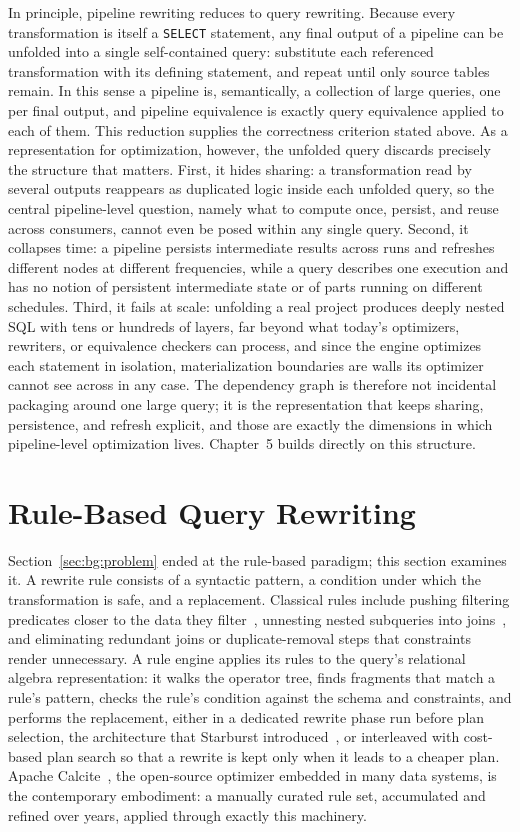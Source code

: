 In principle, pipeline rewriting reduces to query rewriting. Because
every transformation is itself a \texttt{SELECT} statement, any
final output of a pipeline can be unfolded into a single
self-contained query: substitute each referenced transformation with
its defining statement, and repeat until only source tables remain.
In this sense a pipeline is, semantically, a collection of large
queries, one per final output, and pipeline equivalence is exactly
query equivalence applied to each of them. This reduction supplies
the correctness criterion stated above. As a representation for
optimization, however, the unfolded query discards precisely the
structure that matters. First, it hides sharing: a transformation
read by several outputs reappears as duplicated logic inside each
unfolded query, so the central pipeline-level question, namely what
to compute once, persist, and reuse across consumers, cannot even be
posed within any single query. Second, it collapses time: a pipeline
persists intermediate results across runs and refreshes different
nodes at different frequencies, while a query describes one
execution and has no notion of persistent intermediate state or of
parts running on different schedules. Third, it fails at scale:
unfolding a real project produces deeply nested SQL with tens or
hundreds of layers, far beyond what today's optimizers, rewriters,
or equivalence checkers can process, and since the engine optimizes
each statement in isolation, materialization boundaries are walls
its optimizer cannot see across in any case. The dependency graph is
therefore not incidental packaging around one large query; it is the
representation that keeps sharing, persistence, and refresh
explicit, and those are exactly the dimensions in which
pipeline-level optimization lives. Chapter~5 builds directly on this
structure.

\section{Rule-Based Query Rewriting}
\label{sec:bg:rules}

Section~\ref{sec:bg:problem} ended at the rule-based paradigm; this
section examines it. A rewrite rule consists of a syntactic pattern,
a condition under which the transformation is safe, and a
replacement. Classical rules include pushing filtering predicates
closer to the data they filter~\cite{levy1994query}, unnesting
nested subqueries into joins~\cite{kim1982optimizing}, and
eliminating redundant joins or duplicate-removal steps that
constraints render unnecessary. A rule engine applies its rules to
the query's relational algebra representation: it walks the operator
tree, finds fragments that match a rule's pattern, checks the rule's
condition against the schema and constraints, and performs the
replacement, either in a dedicated rewrite phase run before plan
selection, the architecture that Starburst
introduced~\cite{pirahesh1992extensible}, or interleaved with
cost-based plan search so that a rewrite is kept only when it leads
to a cheaper plan. Apache Calcite~\cite{begoli2018apache}, the
open-source optimizer embedded in many data systems, is the
contemporary embodiment: a manually curated rule set, accumulated
and refined over years, applied through exactly this machinery.

